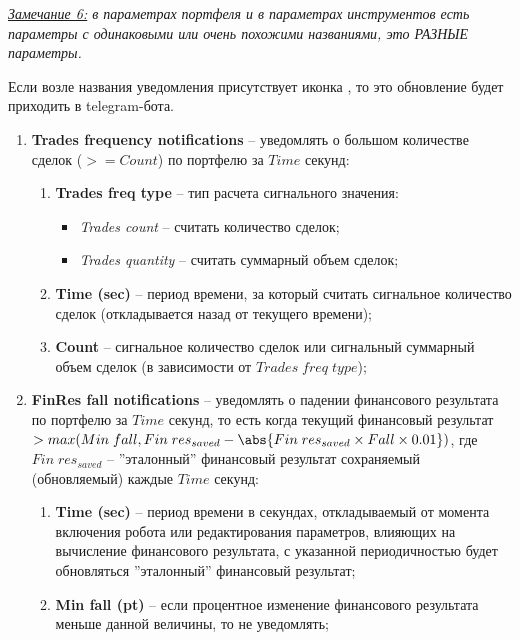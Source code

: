 \noindent\textit{\underline{Замечание 6:} в параметрах портфеля и в параметрах инструментов есть параметры с одинаковыми или очень похожими названиями, это РАЗНЫЕ параметры.}

\label{portfolio_notifications}

Если возле названия уведомления присутствует иконка , то это обновление будет приходить в telegram-бота.

\begin{enumerate}
	\item \textbf{Trades frequency notifications} -- уведомлять о большом количестве сделок ($>= Count$) по портфелю за $Time$ секунд:
	\begin{enumerate}
		\item \textbf{Trades freq type} -- тип расчета сигнального значения:
		\begin{itemize}
			\item \textit{Trades count} -- считать количество сделок;
			\item \textit{Trades quantity} -- считать суммарный объем сделок;
		\end{itemize}
	\item \textbf{Time (sec)} -- период времени, за который считать сигнальное количество сделок (откладывается назад от текущего времени);
		\item \textbf{Count} -- сигнальное количество сделок или сигнальный суммарный объем сделок (в зависимости от $Trades \; freq \; type$);
	\end{enumerate}
	\item \textbf{FinRes fall notifications} -- уведомлять о падении финансового результата по портфелю за $Time$ секунд, то есть когда текущий финансовый
		результат $> max ( Min \; fall, Fin \; res_{saved} - \abs{Fin \; res_{saved} \times Fall \times 0.01} )$, где $Fin \; res_{saved}$ -- ''эталонный''
		финансовый результат сохраняемый (обновляемый) каждые $Time$ секунд:
	\begin{enumerate}
		\item \textbf{Time (sec)} -- период времени в секундах, откладываемый от момента включения робота или редактирования параметров, влияющих на
			вычисление финансового результата, с указанной периодичностью будет обновляться ''эталонный'' финансовый результат;
		\item \textbf{Min fall (pt)} -- если процентное изменение финансового результата меньше данной величины, то не уведомлять;

\end{enumerate}
\end{enumerate}

